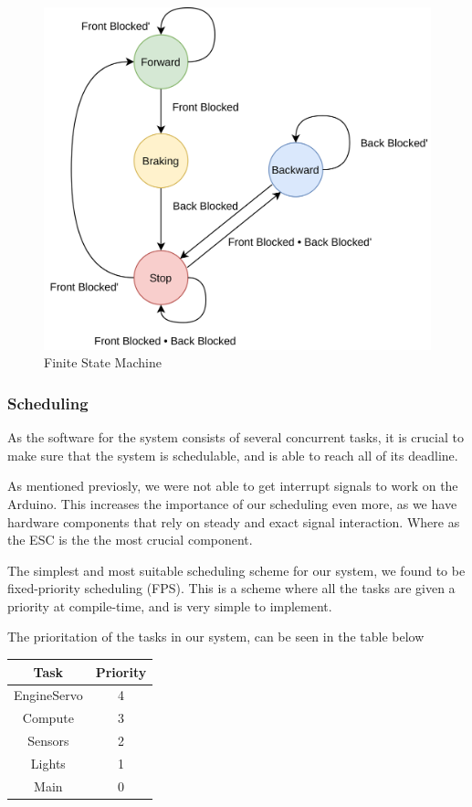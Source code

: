 \documentclass{article}
\begin{document}
\begin{figure}[H]
    \centering
    \includegraphics[width=\linewidth]{../presentation/img/finite-state-machine.png}
    \caption{Finite State Machine}
    \label{fsm}
\end{figure}

\subsubsection{Scheduling}
As the software for the system consists of several concurrent tasks, it is crucial to make sure that the system is schedulable, and is able to reach all of its deadline.

As mentioned previosly, we were not able to get interrupt signals to work on the Arduino. This increases the importance of our scheduling even more, as we have hardware components that rely on steady and exact signal interaction. Where as the ESC is the the most crucial component.

The simplest and most suitable scheduling scheme for our system, we found to be fixed-priority scheduling (FPS). This is a scheme where all the tasks are given a priority at compile-time, and is very simple to implement.

The prioritation of the tasks in our system, can be seen in the table below{}

\begin{center}
 \begin{tabular}{||c c||}
 \hline
 Task & Priority \\ [0.5ex]
 \hline\hline
   EngineServo & 4 \\
 \hline
   Compute & 3 \\
 \hline
   Sensors & 2 \\
 \hline
   Lights & 1 \\
 \hline
   Main & 0 \\ [1ex]
 \hline
\end{tabular}
\end{center}
\end{document}
